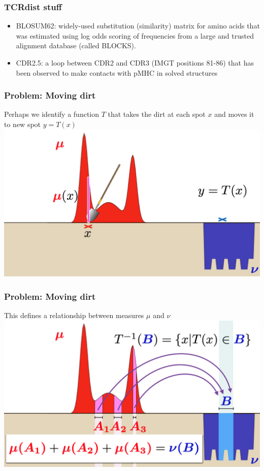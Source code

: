 \documentclass[mathserif,compress,xcolor={dvipsnames}]{beamer}
\renewcommand\;{\,}
\begin{document}
\begin{frame}\frametitle{TCRdist stuff}
\begin{itemize}
\item
BLOSUM62: widely-used substitution (similarity) matrix for amino acids that was estimated using log odds scoring of frequencies from a large and trusted alignment database (called BLOCKS).
\bigskip
\item
CDR2.5: a loop between CDR2 and CDR3 (IMGT positions 81-86) that has been observed to make
contacts with pMHC in solved structures
\end{itemize}
\end{frame}

\begin{frame}\frametitle{Problem: Moving dirt}
Perhaps we identify a function $T$ that takes the dirt at each spot $x$ and moves it to new spot $y = T(x)$
\bigskip
\includegraphics[width=\linewidth]{Images/EMD_shovel.png}
\end{frame}

\begin{frame}\frametitle{Problem: Moving dirt}
This defines a relationship between measures $\mu$ and $\nu$
\bigskip
\includegraphics[width=\linewidth]{Images/EMD_pushforward.png}
\end{frame}
\end{document}
